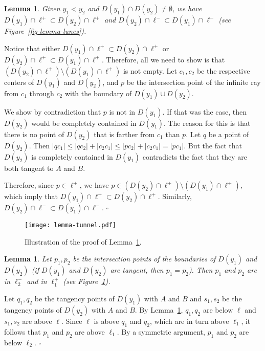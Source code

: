 \documentclass[pdftex,leqno,fleqn,12pt]{article}
\newtheorem{lemma}[theorem]{Lemma}
\newenvironment{proof}{{\textit Proof:} \rm}{\hfill $\square$ \medskip\\}
\begin{document}
\begin{lemma}\label{lemma-lunes}  Given $y_1<y_2$ and $D(y_1)\cap D(y_2)\neq \emptyset$, we have $D(y_1)\cap\ell^+\subset D(y_2)\cap\ell^+$ and
$D(y_2)\cap\ell^-\subset D(y_1)\cap\ell^-$ (see Figure~\ref{fig-lemma-lunes}).
\end{lemma}
\begin{proof}
Notice that either $D(y_1)\cap\ell^+\subset D(y_2)\cap\ell^+$ or $D(y_2)\cap\ell^+\subset
D(y_1)\cap\ell^+$. Therefore, all we need to show is that $(D(y_2)\cap\ell^+)\setminus
(D(y_1)\cap\ell^+)$ is not empty. Let $c_1,c_2$ be the respective centers of $D(y_1)$ and $D(y_2)$,
and $p$ be the intersection point of the infinite ray from $c_1$ through $c_2$ with the boundary of
$D(y_1)\cup D(y_2)$.

We show by contradiction that $p$ is not in $D(y_1)$. If that was the case, then $D(y_2)$ would be
completely contained in $D(y_1)$. The reason for this is that there is no point of $D(y_2)$ that is
farther from $c_1$ than $p$. Let $q$ be a point of $D(y_2)$. Then $|qc_1|\leq |qc_2|+|c_2c_1|\leq
|pc_2|+|c_2c_1|=|pc_1|$. But the fact that $D(y_2)$ is completely contained in $D(y_1)$ contradicts
the fact that they are both tangent to $A$ and $B$.

Therefore, since $p\in \ell^+$, we have $p\in (D(y_2)\cap\ell^+)\setminus (D(y_1)\cap\ell^+)$,
which imply that $D(y_1)\cap\ell^+\subset D(y_2)\cap\ell^+$. Similarly, $D(y_2)\cap\ell^-\subset
D(y_1)\cap\ell^-$.
\end{proof}

\begin{figure}
\centering
\texttt{[image: lemma-tunnel.pdf]}\caption{Illustration of the proof of Lemma~\ref{lemma-tunnel}.}\label{fig-lemma-tunnel}
\end{figure}

\begin{lemma}\label{lemma-tunnel}
Let $p_1,p_2$ be the intersection points of the boundaries of $D(y_1)$ and $D(y_2)$ (if $D(y_1)$
and $D(y_2)$ are tangent, then $p_1=p_2$). Then $p_1$ and $p_2$ are in $\ell_2^-$ and in $\ell_1^+$
(see Figure~\ref{fig-lemma-tunnel}).
\end{lemma}
\begin{proof}
Let $q_1,q_2$ be the tangency points of $D(y_1)$ with $A$ and $B$ and $s_1,s_2$ be the tangency
points of $D(y_2)$ with $A$ and $B$. By Lemma~\ref{lemma-lunes}, $q_1,q_2$ are below $\ell$ and
$s_1,s_2$ are above $\ell$. Since $\ell$ is above $q_1$ and $q_2$, which are in turn above
$\ell_1$, it follows that $p_1$ and $p_2$ are above $\ell_1$. By a symmetric argument, $p_1$ and
$p_2$ are below $\ell_2$.
\end{proof}
\end{document}
